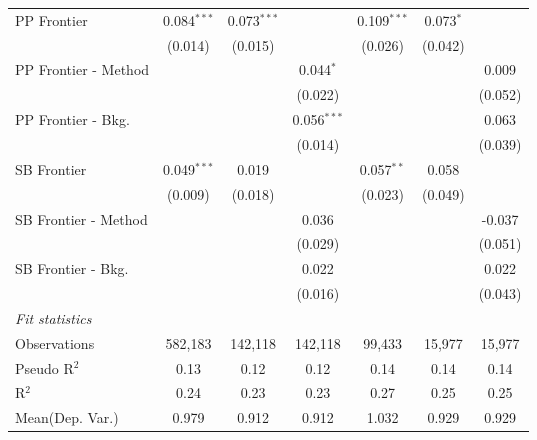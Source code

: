 \begin{tabular}{lcccccc}
   PP Frontier          & 0.084$^{***}$ & 0.073$^{***}$ &               & 0.109$^{***}$ & 0.073$^{*}$ &   \\   
                        & (0.014)       & (0.015)       &               & (0.026)       & (0.042)     &   \\   
   PP Frontier - Method &               &               & 0.044$^{*}$   &               &             & 0.009\\   
                        &               &               & (0.022)       &               &             & (0.052)\\   
   PP Frontier - Bkg.   &               &               & 0.056$^{***}$ &               &             & 0.063\\   
                        &               &               & (0.014)       &               &             & (0.039)\\   
   SB Frontier          & 0.049$^{***}$ & 0.019         &               & 0.057$^{**}$  & 0.058       &   \\   
                        & (0.009)       & (0.018)       &               & (0.023)       & (0.049)     &   \\   
   SB Frontier - Method &               &               & 0.036         &               &             & -0.037\\   
                        &               &               & (0.029)       &               &             & (0.051)\\   
   SB Frontier - Bkg.   &               &               & 0.022         &               &             & 0.022\\   
                        &               &               & (0.016)       &               &             & (0.043)\\   
   \midrule
   \emph{Fit statistics}\\
   Observations         & 582,183       & 142,118       & 142,118       & 99,433        & 15,977      & 15,977\\  
   Pseudo R$^2$         & 0.13          & 0.12          & 0.12          & 0.14          & 0.14        & 0.14\\  
   R$^2$                & 0.24          & 0.23          & 0.23          & 0.27          & 0.25        & 0.25\\  
Mean(Dep. Var.) & 0.979 & 0.912 & 0.912 & 1.032 & 0.929 & 0.929 \\
   

\end{tabular}
